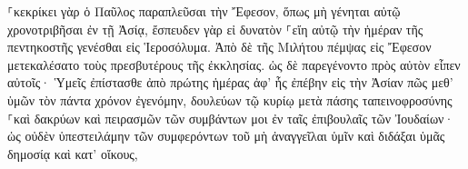 \documentclass{openreader}
\begin{document}
⸀κεκρίκει γὰρ ὁ Παῦλος παραπλεῦσαι τὴν Ἔφεσον, ὅπως μὴ γένηται αὐτῷ χρονοτριβῆσαι ἐν τῇ Ἀσίᾳ, ἔσπευδεν γὰρ εἰ δυνατὸν ⸀εἴη αὐτῷ τὴν ἡμέραν τῆς πεντηκοστῆς γενέσθαι εἰς Ἱεροσόλυμα. 
Ἀπὸ δὲ τῆς Μιλήτου πέμψας εἰς Ἔφεσον μετεκαλέσατο τοὺς πρεσβυτέρους τῆς ἐκκλησίας. 
ὡς δὲ παρεγένοντο πρὸς αὐτὸν εἶπεν αὐτοῖς· Ὑμεῖς ἐπίστασθε ἀπὸ πρώτης ἡμέρας ἀφ’ ἧς ἐπέβην εἰς τὴν Ἀσίαν πῶς μεθ’ ὑμῶν τὸν πάντα χρόνον ἐγενόμην, 
δουλεύων τῷ κυρίῳ μετὰ πάσης ταπεινοφροσύνης ⸀καὶ δακρύων καὶ πειρασμῶν τῶν συμβάντων μοι ἐν ταῖς ἐπιβουλαῖς τῶν Ἰουδαίων· 
ὡς οὐδὲν ὑπεστειλάμην τῶν συμφερόντων τοῦ μὴ ἀναγγεῖλαι ὑμῖν καὶ διδάξαι ὑμᾶς δημοσίᾳ καὶ κατ’ οἴκους, 
\end{document}
